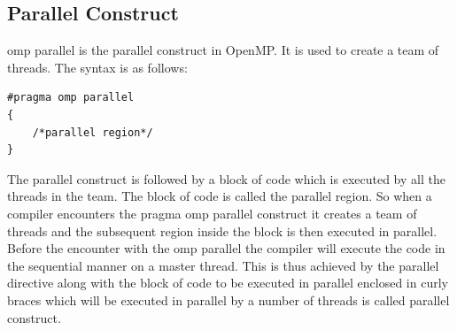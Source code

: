 \documentclass[12pt]{article}
\begin{document}
\subsection{Parallel Construct}

omp parallel is the parallel construct in OpenMP. 
It is used to create a team of threads. The syntax is as follows:
\begin{lstlisting}
#pragma omp parallel
{
    /*parallel region*/
}
\end{lstlisting}
The parallel construct is followed by a block of code which is executed by all the threads in the team. 
The block of code is called the parallel region. So when a compiler encounters the pragma omp parallel construct it creates a team of 
threads and the subsequent region inside the block is then executed in parallel. Before the encounter with the omp parallel the compiler will execute the code in 
the sequential manner on a master thread. This is thus achieved by the parallel directive along with the block of code to be executed in parallel enclosed in curly braces which will be executed in parallel by a number of threads is 
called parallel construct.
\end{document}
